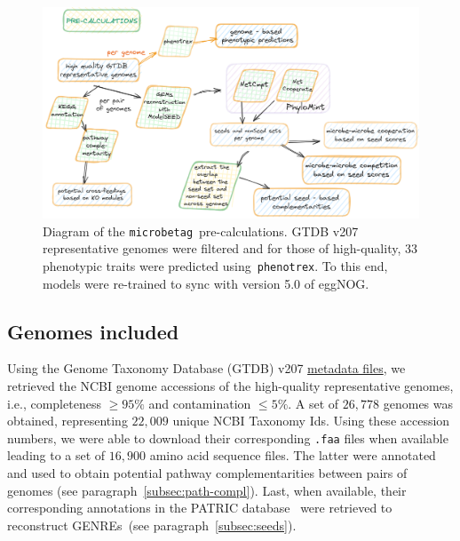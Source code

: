 \documentclass[sn-mathphys,Numbered]{sn-jnl}  %
\theoremstyle{thmstyleone}%
\theoremstyle{thmstyletwo}%
\theoremstyle{thmstylethree}%
\newcommand{\microbetag}{\texttt{microbetag}}
\begin{document}
    \begin{figure}[h!]
        \label{fig:precalc}
        \includegraphics[width=0.9\columnwidth]{figs/microbetag-precal.png}
        \caption{
            Diagram of the \microbetag~pre-calculations.
            GTDB v207 representative genomes were filtered and for those of high-quality,
            33 phenotypic traits were predicted using~\texttt{phenotrex}.
            To this end, models were re-trained to sync with version 5.0 of eggNOG.
        }
    \end{figure}


    \subsection*{Genomes included}
    \label{subsec:genomes}

        Using the Genome Taxonomy Database (GTDB) v207 \href{https://data.gtdb.ecogenomic.org/releases/release207/207.0/}{metadata files}, we retrieved the NCBI genome accessions of the high-quality representative genomes, i.e., completeness $\geq 95\%$  and contamination $\leq 5\%$.
        A set of $26,778$ genomes was obtained, representing $22,009$ unique NCBI Taxonomy Ids.
        Using these accession numbers, we were able to download their corresponding \texttt{.faa} files when available 
        leading to a set of $16,900$ amino acid sequence files.
        The latter were annotated and used to obtain potential pathway complementarities between pairs of genomes (see paragraph~\ref{subsec:path-compl}).
        Last, when available, their corresponding annotations in the PATRIC database~\cite{wattam2017improvements} were retrieved to reconstruct GENREs~(see paragraph~\ref{subsec:seeds}).
\end{document}
